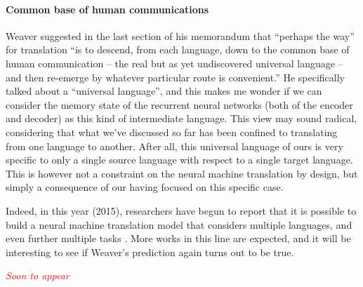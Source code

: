 \documentclass{report}
\newcommand{\alert}[1]{\textcolor{red}{#1}}
\begin{document}
\paragraph{Common base of human communications}

Weaver suggested in the last section of his memorandum that ``perhaps the way''
for translation ``is to descend, from each language, down to the common base of
human communication -- the real but as yet undiscovered universal language --
and then re-emerge by whatever particular route is convenient.'' He specifically
talked about a ``universal language'', and this makes me wonder if we can
consider the memory state of the recurrent neural networks (both of the encoder
and decoder) as this kind of intermediate language. This view may sound radical,
considering that what we've discussed so far has been confined to translating
from one language to another. After all, this universal language of ours is very
specific to only a single source language with respect to a single target
language. This is however not a constraint on the neural machine translation by
design, but simply a consequence of our having focused on this specific case. 

Indeed, in this year (2015), researchers have begun to report that it is
possible to build a neural machine translation model that considers multiple
languages, and even further multiple tasks \cite{dong2015multi,luong2015}. More
works in this line are expected, and it will be interesting to see if Weaver's
prediction again turns out to be true.
















\alert{\it Soon to appear}










\end{document}
